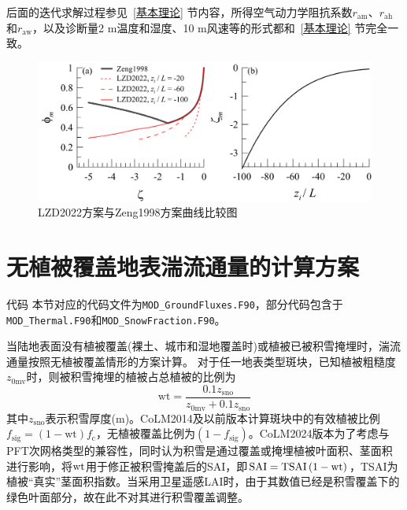 后面的迭代求解过程参见~\ref{基本理论} 节内容，所得空气动力学阻抗系数$r_{\mathrm{am}}$、$r_{\mathrm{ah}}$和$r_{\mathrm{aw}}$，以及诊断量2 m温度和湿度、10 m风速等的形式都和~\ref{基本理论} 节完全一致。
{
  \begin{figure}[htbp]
    \centering
    \includegraphics[scale=0.7]{Figures/地表湍流交换过程/LZD2022方案与Zeng1998方案曲线比较图.png}
    \caption{LZD2022方案与Zeng1998方案曲线比较图}
    \label{fig:LZD2022方案与Zeng1998方案曲线比较图}
  \end{figure}
}


\section{无植被覆盖地表湍流通量的计算方案}\label{无植被覆盖地表湍流通量的计算方案}
\begin{mymdframed}{代码}
  本节对应的代码文件为\texttt{MOD\_GroundFluxes.F90}，部分代码包含于\texttt{MOD\_Thermal.F90}和\texttt{MOD\_SnowFraction.F90}。
\end{mymdframed}

当陆地表面没有植被覆盖(裸土、城市和湿地覆盖时)或植被已被积雪掩埋时，湍流通量按照无植被覆盖情形的方案计算。
对于任一地表类型斑块，已知植被粗糙度$z_{\mathrm{0mv}}$时，则被积雪掩埋的植被占总植被的比例为
\begin{equation}
  {\mathrm {wt}}=\frac{0.1 z_{\mathrm{sno}}}{z_{\mathrm{0mv}}+0.1 z_{\mathrm{sno}}}
\end{equation}
其中$z_{\mathrm{sno}}$表示积雪厚度(m)。CoLM2014及以前版本计算斑块中的有效植被比例$f_{\mathrm{sig}}=\left(1-{\mathrm {wt}}\right)f_{\mathrm{c}}$，无植被覆盖比例为$\left(1-f_{\mathrm{sig}}\right)$。CoLM2024版本为了考虑与PFT次网格类型的兼容性，同时认为积雪是通过覆盖或掩埋植被叶面积、茎面积进行影响，将$\rm wt$用于修正被积雪掩盖后的SAI，即${\rm SAI=TSAI}\left(1-{\mathrm {wt}}\right)$，TSAI为植被“真实”茎面积指数。当采用卫星遥感LAI时，由于其数值已经是积雪覆盖下的绿色叶面部分，故在此不对其进行积雪覆盖调整。


